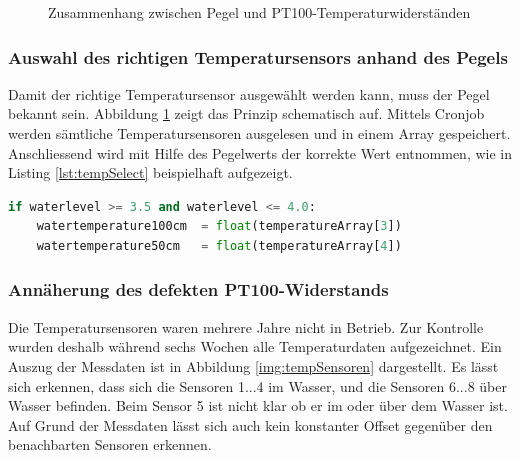 \begin{figure}[htbp]
	\centering
	\caption{Zusammenhang zwischen Pegel und PT100-Temperaturwiderständen}
	\label{img:wassertempsensoren}
\end{figure}

\subsubsection{Auswahl des richtigen Temperatursensors anhand des Pegels}
Damit der richtige Temperatursensor ausgewählt werden kann, muss der Pegel bekannt sein. Abbildung \ref{img:wassertempsensoren} zeigt das Prinzip schematisch auf. Mittels Cronjob werden sämtliche Temperatursensoren ausgelesen und in einem Array gespeichert. Anschliessend wird mit Hilfe des Pegelwerts der korrekte Wert entnommen, wie in Listing \ref{lst:tempSelect} beispielhaft aufgezeigt.

\begin{lstlisting}[label=lst:tempSelect,caption=Auswahl des richtigen Temperatursensors, language=Python, style=py]
if waterlevel >= 3.5 and waterlevel <= 4.0:
    watertemperature100cm  = float(temperatureArray[3])
    watertemperature50cm   = float(temperatureArray[4])
\end{lstlisting}




\subsubsection{Annäherung des defekten PT100-Widerstands}
Die Temperatursensoren waren mehrere Jahre nicht in Betrieb. Zur Kontrolle wurden deshalb während sechs Wochen alle Temperaturdaten aufgezeichnet. Ein Auszug der Messdaten ist in Abbildung \ref{img:tempSensoren} dargestellt. Es lässt sich erkennen, dass sich die Sensoren 1...4 im Wasser, und die Sensoren 6...8 über Wasser befinden. Beim Sensor 5 ist nicht klar ob er im oder über dem Wasser ist. Auf Grund der Messdaten lässt sich auch kein konstanter Offset gegenüber den benachbarten Sensoren erkennen.

